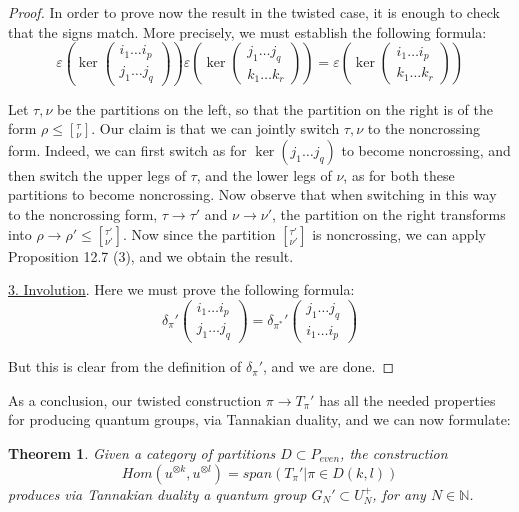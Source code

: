 \documentclass[12pt]{amsbook}
\newtheorem{theorem}{Theorem}[chapter]
\begin{document}
\begin{proof}
In order to prove now the result in the twisted case, it is enough to check that the signs match. More precisely, we must establish the following formula:
$$\varepsilon\left(\ker\begin{pmatrix}i_1\ldots i_p\\ j_1\ldots j_q\end{pmatrix}\right)
\varepsilon\left(\ker\begin{pmatrix}j_1\ldots j_q\\ k_1\ldots k_r\end{pmatrix}\right)
=\varepsilon\left(\ker\begin{pmatrix}i_1\ldots i_p\\ k_1\ldots k_r\end{pmatrix}\right)$$

Let $\tau,\nu$ be the partitions on the left, so that the partition on the right is of the form $\rho\leq[^\tau_\nu]$. Our claim is that we can jointly switch $\tau,\nu$ to the noncrossing form. Indeed, we can first switch as for $\ker(j_1\ldots j_q)$ to become noncrossing, and then switch the upper legs of $\tau$, and the lower legs of $\nu$, as for both these partitions to become noncrossing. Now observe that when switching in this way to the noncrossing form, $\tau\to\tau'$ and $\nu\to\nu'$, the partition on the right transforms into $\rho\to\rho'\leq[^{\tau'}_{\nu'}]$. Now since the partition $[^{\tau'}_{\nu'}]$ is noncrossing, we can apply Proposition 12.7 (3), and we obtain the result.

\medskip

\underline{3. Involution}. Here we must prove the following formula:
$$\delta_\pi'\begin{pmatrix}i_1\ldots i_p\\ j_1\ldots j_q\end{pmatrix}=\delta_{\pi^*}'\begin{pmatrix}j_1\ldots j_q\\ i_1\ldots i_p\end{pmatrix}$$

But this is clear from the definition of $\delta_\pi'$, and we are done.
\end{proof}

As a conclusion, our twisted construction $\pi\to T_\pi'$ has all the needed properties for producing quantum groups, via Tannakian duality, and we can now formulate:

\begin{theorem}
Given a category of partitions $D\subset P_{even}$, the construction
$$Hom(u^{\otimes k},u^{\otimes l})=span\left(T_\pi'\Big|\pi\in D(k,l)\right)$$
produces via Tannakian duality a quantum group $G_N'\subset U_N^+$, for any $N\in\mathbb N$.
\end{theorem}
\end{document}
